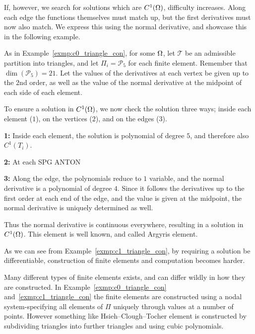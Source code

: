 If, however, we search for solutions which 
are $C^1(\Omega)$, difficulty increases. Along each edge the functions 
themselves must match up, but the first derivatives must now also match. 
We express this using the normal derivative, and showcase this in the 
following example. 
\begin{exmp}{\quad\label{exmp:c1_triangle_con}}
   As in Example~\ref{exmp:c0_triangle_con}, 
    for some $\Omega$, let $\mathcal{T}$ be an admissible partition into 
    triangles, and let $\Pi_i = \mathcal{P}_5$ for each finite element.
    Remember that $\dim(\mathcal{P}_5) = 21$.
    Let the values of the derivatives at each vertex be given up 
    to the $2$nd order, as well as the value of the normal derivative at the 
    midpoint of each side of each element.
    
    To ensure a solution in $C^1(\Omega)$, 
    we now check the solution three ways; inside each element ($1$), 
    on the vertices ($2$), and on the edges ($3$).
    \iffalse
    we now check the solution three ways:
    \begin{enumerate}
        \item Inside each element
        \item On the vertices
        \item On the edges
    \end{enumerate} 
    \fi

    \textbf{1:} Inside each element, the solution is polynomial of degree $5$, 
    and therefore also $C^1(T_i)$.

    \textbf{2:} At each SPG ANTON

    \textbf{3:} Along the edge, the polynomials reduce to $1$ variable, and the 
    normal derivative is a polynomial of degree $4$. Since it follows 
    the derivatives up to the first order at each end of the edge, and 
    the value is given at the midpoint, the normal derivative is uniquely 
    determined as well.

    Thus the normal derivative is continuous everywhere, resulting in a 
    solution in $C^1(\Omega)$. This element is well known, and called 
    Argyris element.
\end{exmp}
As we can see from Example~\ref{exmp:c1_triangle_con}, by requiring a 
solution be differentiable, construction of finite elements and computation 
becomes harder. 

Many different types of finite elements exists, and can differ wildly in how they 
are constructed. In Example~\ref{exmp:c0_triangle_con} and~\ref{exmp:c1_triangle_con} 
the finite elements are constructed using a nodal system-specifying all elements of $\Pi$ 
uniquely through values at a number of points. However something like Hsieh–Clough–Tocher element 
is constructed by subdividing triangles into further triangles and using 
cubic polynomials.

